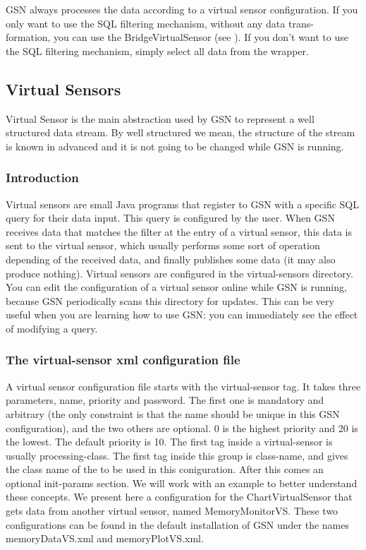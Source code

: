 GSN always processes the data according to a virtual sensor configuration.
If you only want to use the SQL filtering mechanism, without any data trans-
formation, you can use the BridgeVirtualSensor (see ).
If you don't want to use the SQL filtering mechanism, simply select all data
from the wrapper.

\subsection{Virtual Sensors}


Virtual Sensor is the main abstraction used by GSN to represent a well structured data stream.
By well structured we mean, the structure of the stream is known in advanced and it is not going to be changed
while GSN is running.
\subsubsection{Introduction}
Virtual sensors are small Java programs that register to GSN with a specific
SQL query for their data input. This query is configured by the user. When
GSN receives data that matches the filter at the entry of a virtual sensor, this
data is sent to the virtual sensor, which usually performs some sort of operation
depending of the received data, and finally publishes some data (it may also
produce nothing).
Virtual sensors are configured in the virtual-sensors directory. You can edit
the configuration of a virtual sensor online while GSN is running, because GSN
periodically scans this directory for updates. This can be very useful when you
are learning how to use GSN: you can immediately see the effect of modifying
a query.

\subsubsection{The virtual-sensor xml configuration file}

A virtual sensor configuration file starts with the virtual-sensor tag. It takes
three parameters, name, priority and password. The first one is mandatory
and arbitrary (the only constraint is that the name should be unique in this
GSN configuration), and the two others are optional. 0 is the highest priority
and 20 is the lowest. The default priority is 10.
The first tag inside a virtual-sensor is usually processing-class. The first tag
inside this group is class-name, and gives the class name of the \vsp
to be used in this coniguration. After this comes an optional init-params
section.
We will work with an example to better understand these concepts. We
present here a configuration for the ChartVirtualSensor that gets data from
another virtual sensor, named MemoryMonitorVS. These two configurations can
be found in the default installation of GSN under the names memoryDataVS.xml
and memoryPlotVS.xml.

